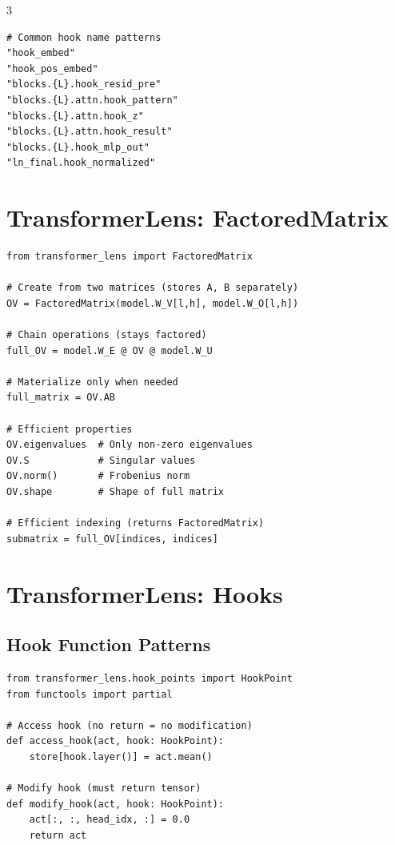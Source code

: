 \documentclass[10pt,a4paper,landscape]{article}
\begin{document}
\begin{multicols}{3}
\begin{lstlisting}
# Common hook name patterns
"hook_embed"
"hook_pos_embed"
"blocks.{L}.hook_resid_pre"
"blocks.{L}.attn.hook_pattern"
"blocks.{L}.attn.hook_z"
"blocks.{L}.attn.hook_result"
"blocks.{L}.hook_mlp_out"
"ln_final.hook_normalized"
\end{lstlisting}

\section{TransformerLens: FactoredMatrix}

\begin{lstlisting}
from transformer_lens import FactoredMatrix

# Create from two matrices (stores A, B separately)
OV = FactoredMatrix(model.W_V[l,h], model.W_O[l,h])

# Chain operations (stays factored)
full_OV = model.W_E @ OV @ model.W_U

# Materialize only when needed
full_matrix = OV.AB

# Efficient properties
OV.eigenvalues  # Only non-zero eigenvalues
OV.S            # Singular values
OV.norm()       # Frobenius norm
OV.shape        # Shape of full matrix

# Efficient indexing (returns FactoredMatrix)
submatrix = full_OV[indices, indices]
\end{lstlisting}

\section{TransformerLens: Hooks}

\subsection{Hook Function Patterns}
\begin{lstlisting}
from transformer_lens.hook_points import HookPoint
from functools import partial

# Access hook (no return = no modification)
def access_hook(act, hook: HookPoint):
    store[hook.layer()] = act.mean()

# Modify hook (must return tensor)
def modify_hook(act, hook: HookPoint):
    act[:, :, head_idx, :] = 0.0
    return act


\end{lstlisting}
\end{multicols}
\end{document}
